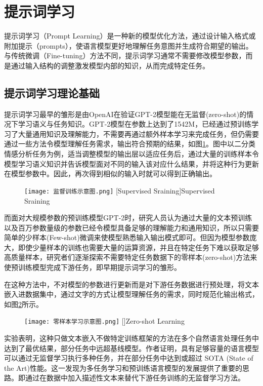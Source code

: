 \section{提示词学习}
提示词学习（Prompt Learning）是一种新的模型优化方法，通过设计输入格式或附加提示（prompts），使语言模型更好地理解任务意图并生成符合期望的输出。与传统微调（Fine-tuning）方法不同，提示词学习通常不需要修改模型参数，而是通过输入结构的调整激发模型内部的知识，从而完成特定任务。
\subsection{提示词学习理论基础}
提示词学习最早的雏形是由OpenAI在验证GPT-2模型能在无监督(zero-shot)的情况下学习语义与任务知识\cite{radford2019language}。GPT-2模型在参数上达到了1542M，已经通过预训练学习了大量通用知识及理解能力，不需要再通过额外样本学习来完成任务，但仍需要通过一些方法令模型理解任务需求，输出符合预期的结果，如图\ref{fig:监督学习示意图}。图中以二分类情感分析任务为例，适当调整模型的输出层以适应任务后，通过大量的训练样本令模型学习语义知识并告诉模型面对不同的输入该对应什么结果，并将这种行为更新在模型参数中。因此，再次得到相似的输入时就可以得到正确输出。
\begin{figure}[!htbp]
  \centering
  \texttt{[image: 监督训练示意图.png]}
  [Supervised Sraining]{Supervised Sraining}
  \label{fig:监督学习示意图}
\end{figure}

而面对大规模参数的预训练模型GPT-2时，研究人员认为通过大量的文本预训练以及百万参数量级的参数已经令模型具备足够的理解能力和通用知识，所以只需要简单的少样本(Few-shot)微调来使模型熟悉输入输出模式即可。但因为模型参数庞大，即使少量样本的训练也需要大量的运算资源，并且在特定任务下难以获取足够高质量样本，研究者们逐渐探索不需要特定任务数据下的零样本(zero-shot)方法来使预训练模型完成下游任务，即早期提示词学习的雏形。

在这种方法中，不对模型的参数进行更新而是对下游任务数据进行预处理，将文本嵌入进数据集中，通过文字的方式让模型理解任务的需求，同时规范化输出格式，如图\ref{fig: 零样本学习示意图}所示。
\begin{figure}[!htbp]
  \centering
  \texttt{[image: 零样本学习示意图.png]}
  []{Zero-shot Learning}
  \label{fig: 零样本学习示意图}
\end{figure}

实验表明，这种只做文本嵌入不做特定训练框架的方法在多个自然语言处理任务中达到了最优结果，部分任务中远超基线模型。作者证明，具有足够容量的语言模型可以通过无监督学习执行多种任务，并在部分任务中达到或超过 SOTA (State of the Art)性能。这一发现为多任务学习和预训练语言模型的发展提供了重要的思路。即通过在数据中加入描述性文本来替代下游任务训练的无监督学习方法。

